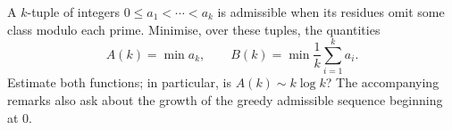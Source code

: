 A $k$-tuple of integers $0\leq a_1<\cdots<a_k$ is admissible when its residues omit some class modulo each prime. Minimise, over these tuples, the quantities
\[A(k)=\min a_k,\qquad B(k)=\min\frac1k\sum_{i=1}^k a_i.\]
Estimate both functions; in particular, is $A(k)\sim k\log k$? The accompanying remarks also ask about the growth of the greedy admissible sequence beginning at $0$.
